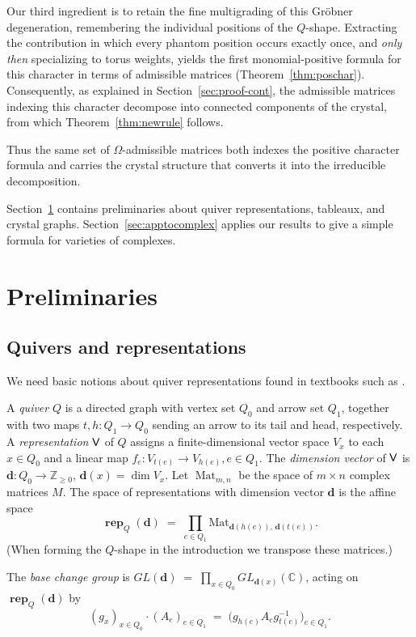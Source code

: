 \documentclass[12pt]{amsart}
\DeclareMathOperator{\rep}{\mathbf{rep}}
\theoremstyle{definition}
\theoremstyle{remark}
\begin{document}
Our third ingredient is to retain the fine multigrading of this
Gr\"obner degeneration, remembering the individual positions of
the $Q$-shape. Extracting the contribution in which every phantom
position occurs exactly once, and \emph{only then} specializing to torus
weights, yields the first monomial-positive formula for this character
in terms of admissible matrices (Theorem~\ref{thm:poschar}).
Consequently, as explained in Section~\ref{sec:proof-cont}, the
admissible matrices indexing this character decompose into connected
components of the crystal, from which Theorem~\ref{thm:newrule}
follows.

Thus the same set of $\Omega$-admissible matrices both indexes the positive character formula and carries
the crystal structure that converts it into the irreducible decomposition.

Section~\ref{sec:S1} contains preliminaries about quiver representations, tableaux, and crystal graphs.
Section~\ref{sec:apptocomplex} applies our results to give a simple formula for varieties of complexes.

\section{Preliminaries}\label{sec:S1}

\subsection{Quivers and representations}
We need basic notions about quiver representations found
in textbooks such as \cite{Derksenbook}. 

A \emph{quiver} $Q$ is a directed graph with vertex set $Q_0$ and arrow set $Q_1$, together with two maps
$t,h : Q_1 \to Q_0$ 
sending an arrow to its tail and head, respectively.
A \emph{representation} ${\sf V}$ of $Q$ assigns a finite-dimensional vector space $V_x$ to each $x\in Q_0$
and a linear map 
$f_e:V_{t(e)}\to V_{h(e)}, e\in Q_1$. 
The \emph{dimension vector} of ${\sf V}$ is 
$\mathbf d:Q_0\to {\mathbb Z}_{\ge 0},  \, \mathbf d(x)=\dim V_x$.
Let $\operatorname{Mat}_{m,n}$ be the space of $m\times n$ complex matrices $M$.
The space of representations with dimension vector $\mathbf d$ is the affine space
\[\rep_Q(\mathbf d) \;=\; \prod_{e\in Q_1} \mathrm{Mat}_{\mathbf d(h(e)),\,\mathbf d(t(e))}.\]
(When forming the $Q$-shape in the introduction we transpose these matrices.)

The \emph{base change group} is
$GL(\mathbf d) \;=\; \prod_{x\in Q_0} GL_{\mathbf d(x)}({\mathbb C})$,
acting on $\rep_Q(\mathbf d)$ by
\begin{equation}\label{eqn:bcgaction}
(g_x)_{x\in Q_0}\cdot (A_e)_{e\in Q_1} \;=\; \bigl(g_{h(e)}A_e g_{t(e)}^{-1}\bigr)_{e\in Q_1}.
\end{equation}
\end{document}
